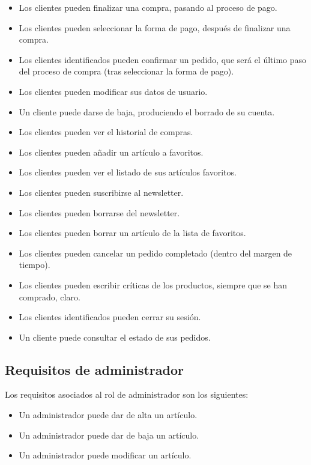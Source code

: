 \begin{itemize}
\item Los clientes pueden finalizar una compra, pasando al proceso de pago.
\item Los clientes pueden seleccionar la forma de pago, después de finalizar una compra.
\item Los clientes identificados pueden confirmar un pedido, que será el último paso del proceso de compra (tras seleccionar la forma de pago).
\item Los clientes pueden modificar sus datos de usuario.
\item Un cliente puede darse de baja, produciendo el borrado de su cuenta.
\item Los clientes pueden ver el historial de compras.
\item Los clientes pueden añadir un artículo a favoritos.
\item Los clientes pueden ver el listado de sus artículos favoritos.
\item Los clientes pueden suscribirse al newsletter.
\item Los clientes pueden borrarse del newsletter.
\item Los clientes pueden borrar un artículo de la lista de favoritos.
\item Los clientes pueden cancelar un pedido completado (dentro del margen de tiempo).
\item Los clientes pueden escribir críticas de los productos, siempre que se han comprado, claro.
\item Los clientes identificados pueden cerrar su sesión.
\item Un cliente puede consultar el estado de sus pedidos.
\end{itemize}

\subsection{Requisitos de administrador}


Los requisitos asociados al rol de administrador son los siguientes:

\begin{itemize}
\item Un administrador puede dar de alta un artículo.
\item Un administrador puede dar de baja un artículo.
\item Un administrador puede modificar un artículo.
\end{itemize}

